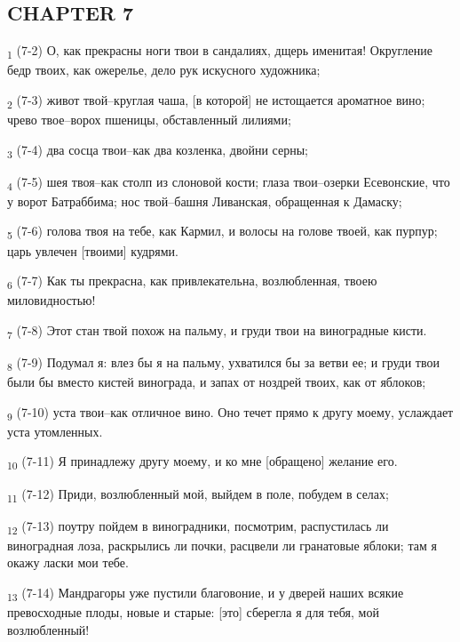 \subsection{CHAPTER 7}
\begin{tcolorbox}
\textsubscript{1} (7-2) О, как прекрасны ноги твои в сандалиях, дщерь именитая! Округление бедр твоих, как ожерелье, дело рук искусного художника;
\end{tcolorbox}
\begin{tcolorbox}
\textsubscript{2} (7-3) живот твой--круглая чаша, [в которой] не истощается ароматное вино; чрево твое--ворох пшеницы, обставленный лилиями;
\end{tcolorbox}
\begin{tcolorbox}
\textsubscript{3} (7-4) два сосца твои--как два козленка, двойни серны;
\end{tcolorbox}
\begin{tcolorbox}
\textsubscript{4} (7-5) шея твоя--как столп из слоновой кости; глаза твои--озерки Есевонские, что у ворот Батраббима; нос твой--башня Ливанская, обращенная к Дамаску;
\end{tcolorbox}
\begin{tcolorbox}
\textsubscript{5} (7-6) голова твоя на тебе, как Кармил, и волосы на голове твоей, как пурпур; царь увлечен [твоими] кудрями.
\end{tcolorbox}
\begin{tcolorbox}
\textsubscript{6} (7-7) Как ты прекрасна, как привлекательна, возлюбленная, твоею миловидностью!
\end{tcolorbox}
\begin{tcolorbox}
\textsubscript{7} (7-8) Этот стан твой похож на пальму, и груди твои на виноградные кисти.
\end{tcolorbox}
\begin{tcolorbox}
\textsubscript{8} (7-9) Подумал я: влез бы я на пальму, ухватился бы за ветви ее; и груди твои были бы вместо кистей винограда, и запах от ноздрей твоих, как от яблоков;
\end{tcolorbox}
\begin{tcolorbox}
\textsubscript{9} (7-10) уста твои--как отличное вино. Оно течет прямо к другу моему, услаждает уста утомленных.
\end{tcolorbox}
\begin{tcolorbox}
\textsubscript{10} (7-11) Я принадлежу другу моему, и ко мне [обращено] желание его.
\end{tcolorbox}
\begin{tcolorbox}
\textsubscript{11} (7-12) Приди, возлюбленный мой, выйдем в поле, побудем в селах;
\end{tcolorbox}
\begin{tcolorbox}
\textsubscript{12} (7-13) поутру пойдем в виноградники, посмотрим, распустилась ли виноградная лоза, раскрылись ли почки, расцвели ли гранатовые яблоки; там я окажу ласки мои тебе.
\end{tcolorbox}
\begin{tcolorbox}
\textsubscript{13} (7-14) Мандрагоры уже пустили благовоние, и у дверей наших всякие превосходные плоды, новые и старые: [это] сберегла я для тебя, мой возлюбленный!
\end{tcolorbox}
